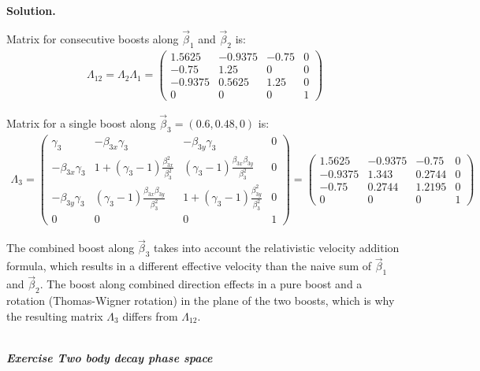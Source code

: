 \documentclass[11pt,a4paper]{article}
\newcounter{zadanie}\newcommand{\zadanie}[1][]{\addtocounter{zadanie}{1} ~\\  {\bf \emph{Exercise \arabic{zadanie} #1 }} \\}
\newenvironment{solution}{\vspace{1cm} \par\textbf{Solution.} \vspace{1cm}}{\newpage}
\begin{document}
\begin{solution}
\vspace{0.5cm}

Matrix for consecutive boosts along $\vec{\beta}_1$ and $\vec{\beta}_2$ is:
\begin{align*}
  \Lambda_{12} = \Lambda_2 \Lambda_1 = \begin{pmatrix}
    1.5625 & -0.9375 & -0.75 & 0 \\
    -0.75 & 1.25 & 0 & 0 \\
    -0.9375 & 0.5625 & 1.25 & 0 \\
    0 & 0 & 0 & 1
  \end{pmatrix}
\end{align*}

Matrix for a single boost along $\vec{\beta}_3 = (0.6, 0.48, 0)$ is:
\begin{align*}
  \Lambda_3 = \begin{pmatrix}
    \gamma_3 & -\beta_{3x} \gamma_3 & -\beta_{3y} \gamma_3 & 0 \\
    -\beta_{3x} \gamma_3 & 1 + (\gamma_3 - 1) \frac{\beta_{3x}^2}{\beta_3^2} & (\gamma_3 - 1) \frac{\beta_{3x}\beta_{3y}}{\beta_3^2} & 0 \\
    -\beta_{3y} \gamma_3 & (\gamma_3 - 1) \frac{\beta_{3x}\beta_{3y}}{\beta_3^2} & 1 + (\gamma_3 - 1) \frac{\beta_{3y}^2}{\beta_3^2} & 0 \\
    0 & 0 & 0 & 1
  \end{pmatrix} = \begin{pmatrix}
    1.5625 & -0.9375 & -0.75 & 0 \\
    -0.9375 & 1.343 & 0.2744 & 0 \\
    -0.75 & 0.2744 & 1.2195 & 0 \\
    0 & 0 & 0 & 1
  \end{pmatrix}
\end{align*}

The combined boost along $\vec{\beta}_3$ takes into account the relativistic velocity addition formula, 
which results in a different effective velocity than the naive sum of $\vec{\beta}_1$ and $\vec{\beta}_2$.
The boost along combined direction effects in a pure boost and a rotation (Thomas-Wigner rotation) in the plane of 
the two boosts, which is why the resulting matrix $\Lambda_3$ differs from $\Lambda_{12}$.

\end{solution}
\zadanie[Two body decay phase space]
\end{document}
